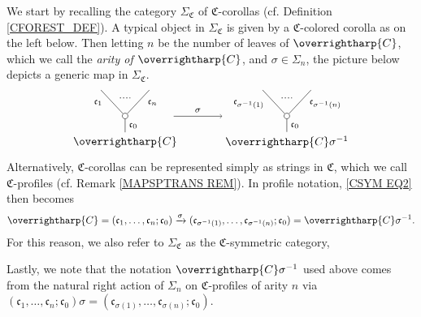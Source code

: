\documentclass[a4paper,10pt]{article}%
\numberwithin{equation}{section}
\numberwithin{figure}{section}
\theoremstyle{definition} %
\newcommand{\vect}[1]{\text{\overrightharp{\ensuremath{#1}}}}
\newcommand{\1}{\ensuremath{\mathbbm 1}}%
\begin{document}
We start by recalling the category 
$\Sigma_{\mathfrak{C}}$
of $\mathfrak{C}$-corollas (cf. Definition \ref{CFOREST_DEF}).
A typical object in $\Sigma_{\mathfrak{C}}$
is given by a 
$\mathfrak{C}$-colored corolla as on the left below.
Then letting $n$ be the number of leaves of $\vect{C}$,
which we call the \emph{arity of $\vect{C}$},
and $\sigma \in \Sigma_n$,
the picture below depicts a 
generic map in $\Sigma_{\mathfrak{C}}$.
\begin{equation}\label{CSYM EQ2}
\begin{tikzpicture}
[grow=up,auto,level distance=2.3em,every node/.style = {font=\footnotesize},dummy/.style={circle,draw,inner sep=0pt,minimum size=1.75mm}]

\node at (0,0) [font=\normalsize]{$\vect{C}$}
child{node [dummy] {}
	child{
		edge from parent node [swap,near end] {$\mathfrak c_n$} node [name=Kn] {}}
	child{
		edge from parent node [near end] {$\mathfrak c_1$}
		node [name=Kone,swap] {}}
	edge from parent node [swap] {$\mathfrak c_0$}
};
\draw [dotted,thick] (Kone) -- (Kn) ;
\node at (5,0) [font=\normalsize] {$\vect{C} \sigma^{-1}
	$}
child{node [dummy] {}
	child{
		edge from parent node [swap,near end] {$\mathfrak c_{\sigma^{-1}(n)}$} node [name=Kn] {}}
	child{
		edge from parent node [near end] {$\mathfrak c_{\sigma^{-1}(1)}$}
		node [name=Kone,swap] {}}
	edge from parent node [swap] {$\mathfrak c_0$}
};
\draw [dotted,thick] (Kone) -- (Kn) ;

\draw[->] (1.5,0.8) -- node{$\sigma$} (3,0.8);
\end{tikzpicture}
\end{equation}
Alternatively,
$\mathfrak{C}$-corollas can be represented simply as
strings in $\mathfrak{C}$,
which we call $\mathfrak{C}$-profiles
(cf. Remark \ref{MAPSPTRANS REM}).
In profile notation, 
\eqref{CSYM EQ2} then becomes
\begin{equation}\label{CSYM EQ1}
\vect{C} =
(\mathfrak c_1, \dots, \mathfrak c_n; \mathfrak c_0) \xrightarrow{\sigma} (\mathfrak c_{\sigma^{-1}(1)}, \dots, \mathfrak c_{\sigma^{-1}(n)}; \mathfrak c_0)
= \vect{C} \sigma^{-1}.
\end{equation}
For this reason, we also refer to 
$\Sigma_{\mathfrak{C}}$ as the 
$\mathfrak{C}$-symmetric category,

Lastly, we note that the notation
$\vect{C} \sigma^{-1}$ used above
comes from the natural right action of $\Sigma_n$
on $\mathfrak{C}$-profiles of arity $n$ via
$
(\mathfrak c_1, \dots, \mathfrak c_n; \mathfrak c_0) \sigma
=
(\mathfrak c_{\sigma(1)}, \dots, \mathfrak c_{\sigma(n)}; \mathfrak c_0)$.
\end{document}
